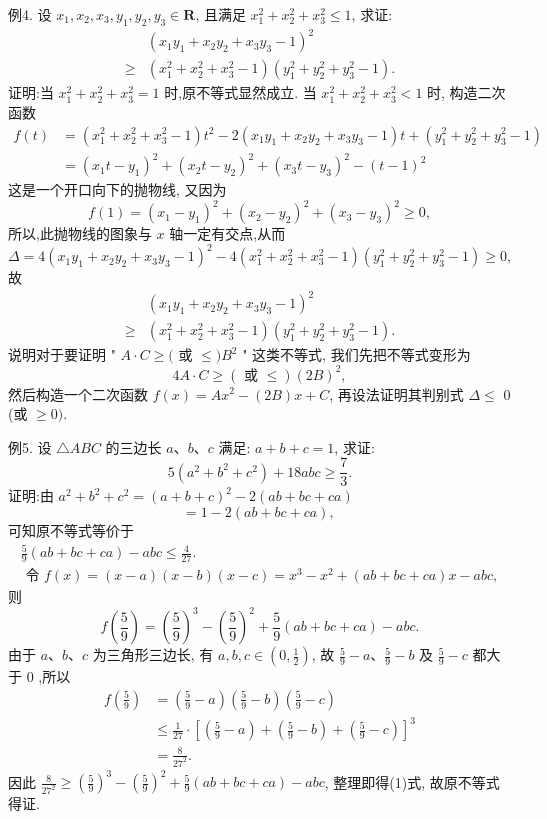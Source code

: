 例4. 设 $x_1, x_2, x_3, y_1, y_2, y_3 \in \mathbf{R}$, 且满足 $x_1^2+x_2^2+x_3^2 \leqslant 1$, 求证:
$$
\begin{aligned}
& \left(x_1 y_1+x_2 y_2+x_3 y_3-1\right)^2 \\
\geqslant & \left(x_1^2+x_2^2+x_3^2-1\right)\left(y_1^2+y_2^2+y_3^2-1\right) .
\end{aligned}
$$
证明:当 $x_1^2+x_2^2+x_3^2=1$ 时,原不等式显然成立.
当 $x_1^2+x_2^2+x_3^2<1$ 时, 构造二次函数
$$
\begin{aligned}
f(t) & =\left(x_1^2+x_2^2+x_3^2-1\right) t^2-2\left(x_1 y_1+x_2 y_2+x_3 y_3-1\right) t+\left(y_1^2+y_2^2+y_3^2-1\right) \\
& =\left(x_1 t-y_1\right)^2+\left(x_2 t-y_2\right)^2+\left(x_3 t-y_3\right)^2-(t-1)^2
\end{aligned}
$$
这是一个开口向下的抛物线, 又因为
$$
f(1)=\left(x_1-y_1\right)^2+\left(x_2-y_2\right)^2+\left(x_3-y_3\right)^2 \geqslant 0,
$$
所以,此抛物线的图象与 $x$ 轴一定有交点,从而
$$
\Delta=4\left(x_1 y_1+x_2 y_2+x_3 y_3-1\right)^2-4\left(x_1^2+x_2^2+x_3^2-1\right)\left(y_1^2+y_2^2+y_3^2-1\right) \geqslant 0,
$$
故
$$
\begin{aligned}
& \left(x_1 y_1+x_2 y_2+x_3 y_3-1\right)^2 \\
\geqslant & \left(x_1^2+x_2^2+x_3^2-1\right)\left(y_1^2+y_2^2+y_3^2-1\right) .
\end{aligned}
$$
说明对于要证明 " $A \cdot C \geqslant($ 或 $\leqslant) B^2$ " 这类不等式, 我们先把不等式变形为
$$
4 A \cdot C \geqslant(\text { 或 } \leqslant)(2 B)^2,
$$
然后构造一个二次函数 $f(x)=A x^2-(2 B) x+C$, 再设法证明其判别式 $\Delta \leqslant$ 0 (或 $\geqslant 0)$.



例5. 设 $\triangle A B C$ 的三边长 $a 、 b 、 c$ 满足: $a+b+c=1$, 求证:
$$
5\left(a^2+b^2+c^2\right)+18 a b c \geqslant \frac{7}{3} .
$$
证明:由 $a^2+b^2+c^2=(a+b+c)^2-2(a b+b c+c a)$
$$
=1-2(a b+b c+c a) \text {, }
$$
可知原不等式等价于
$$
\begin{gathered}
\frac{5}{9}(a b+b c+c a)-a b c \leqslant \frac{4}{27} . \label{(1)} \\
\text { 令 } f(x)=(x-a)(x-b)(x-c)=x^3-x^2+(a b+b c+c a) x-a b c,
\end{gathered}
$$
则
$$
f\left(\frac{5}{9}\right)=\left(\frac{5}{9}\right)^3-\left(\frac{5}{9}\right)^2+\frac{5}{9}(a b+b c+c a)-a b c .
$$
由于 $a 、 b 、 c$ 为三角形三边长, 有 $a, b, c \in\left(0, \frac{1}{2}\right)$, 故 $\frac{5}{9}-a 、 \frac{5}{9}-b$ 及 $\frac{5}{9}-c$ 都大于 0 ,所以
$$
\begin{aligned}
f\left(\frac{5}{9}\right) & =\left(\frac{5}{9}-a\right)\left(\frac{5}{9}-b\right)\left(\frac{5}{9}-c\right) \\
& \leqslant \frac{1}{27} \cdot\left[\left(\frac{5}{9}-a\right)+\left(\frac{5}{9}-b\right)+\left(\frac{5}{9}-c\right)\right]^3 \\
& =\frac{8}{27^2} .
\end{aligned}
$$
因此 $\frac{8}{27^2} \geqslant\left(\frac{5}{9}\right)^3-\left(\frac{5}{9}\right)^2+\frac{5}{9}(a b+b c+c a)-a b c$, 整理即得(1)式, 故原不等式得证.



